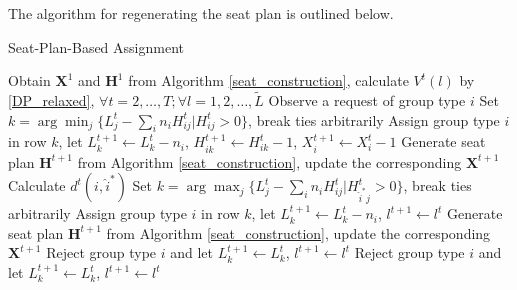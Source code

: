The algorithm for regenerating the seat plan is outlined below.

\begin{algorithm}[H]
  \caption{Seat-Plan-Based Assignment}
  Obtain $\bm{X}^{1}$ and $\bm{H}^{1}$ from Algorithm \ref{seat_construction}, calculate $V^{t}(l)$ by \eqref{DP_relaxed}, $\forall t =2, \ldots, T; \forall l = 1,2, \ldots, \tilde{L}$\;
  {Observe a request of group type ${i}$\;
    {
    {Set $k = \arg \min_{j} \{L_j^{t} - \sum_{i}n_i H^{t}_{ij}|H^{t}_{ij} >0\}$, break ties arbitrarily\; 
     Assign group type $i$ in row $k$, let $L_{k}^{t+1} \gets L_{k}^{t}- n_{i}$, $H_{ik}^{t+1} \gets H_{ik}^{t}-1$, $X_{i}^{t+1}\gets X_{i}^{t}-1$\;
    {Generate seat plan $\bm{H}^{t+1}$ from Algorithm \ref{seat_construction}, update the corresponding $\bm{X}^{t+1}$\;}}
    {Calculate $d^{t}({i}, \hat{i}^{*})$\;
    {Set $k = \arg \max_{j} \{L_j^{t} - \sum_{i}n_i H_{ij}^{t}|H_{\hat{i}^{*} j}^{t} >0\}$, break ties arbitrarily\;
     Assign group type $i$ in row $k$, let $L_{k}^{t+1} \gets L_{k}^{t}- n_{i}$, $l^{t+1} \gets l^{t}$\;
    Generate seat plan $\bm{H}^{t+1}$ from Algorithm \ref{seat_construction}, update the corresponding $\bm{X}^{t+1}$\;}
    {Reject group type ${i}$ and let $L_{k}^{t+1} \gets L_{k}^{t}$, $l^{t+1} \gets l^{t}$\;}}}
    {Reject group type ${i}$ and let $L_{k}^{t+1} \gets L_{k}^{t}$, $l^{t+1} \gets l^{t}$\;}}
\end{algorithm}


